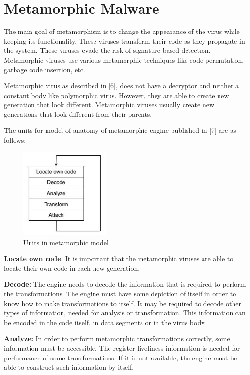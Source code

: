 \chapter{Metamorphic Malware}

The main goal of metamorphism is to change the appearance of the virus while keeping its functionality. These viruses transform their code as they propagate in the system. These viruses evade the risk of signature based detection. Metamorphic viruses use various metamorphic techniques like code permutation, garbage code insertion, etc. 

Metamorphic virus as described in [6], does not have a decryptor and neither a constant body like polymorphic virus. However, they are able to create new generation that look different. Metamorphic viruses usually create new generations that look different from their parents.

The units for model of anatomy of metamorphic engine published in [7] are as follows:

\begin{figure}[htb]
\centering
\includegraphics[width=0.4\textwidth]{images/metamorphic_engine.jpg}
\caption{Units in metamorphic model} 
\label{fig: Units in metamorphic model}
\end{figure}

\textbf{Locate own code:} It is important that the metamorphic viruses are able to locate their own code in each new generation. 
 
\textbf{Decode:} The engine needs to decode the information that is required to perform the transformations. The engine must have some depiction of itself in order to know how to make transformations to itself. It may be required to decode other types of information, needed for analysis or transformation. This information can be encoded in the code itself, in data segments or in the virus body.

\textbf{Analyze:} In order to perform metamorphic transformations correctly, some information must be accessible. The register liveliness information is needed for performance of some transformations. If it is not available, the engine must be able to construct such information by itself.

